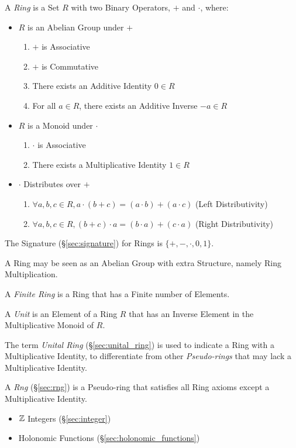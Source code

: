 \begin{itemize}
A \emph{Ring} is a Set $R$ with two Binary Operators, $+$ and
$\cdot$, where:
\begin{itemize}
\item $R$ is an Abelian Group under $+$
    \begin{enumerate}
        \item $+$ is Associative
        \item $+$ is Commutative
        \item There exists an Additive Identity $0 \in R$
        \item For all $a \in R$, there exists an Additive Inverse $-a
          \in R$
    \end{enumerate}
\item $R$ is a Monoid under $\cdot$
    \begin{enumerate}
        \item $\cdot$ is Associative
        \item There exists a Multiplicative Identity $1 \in R$
    \end{enumerate}
\item $\cdot$ Distributes over $+$
    \begin{enumerate}
        \item $\forall a,b,c \in R,
            a \cdot (b + c) = (a \cdot b) + (a \cdot c)$
            (Left Distributivity)
        \item $\forall a,b,c \in R,
            (b + c) \cdot a = (b \cdot a) + (c \cdot a)$
            (Right Distributivity)
    \end{enumerate}
\end{itemize}
The Signature (\S\ref{sec:signature}) for Rings is $\{+, -, \cdot, 0, 1\}$.

A Ring may be seen as an Abelian Group with extra Structure, namely Ring
Multiplication.

A \emph{Finite Ring} is a Ring that has a Finite number of Elements.

A \emph{Unit} is an Element of a Ring $R$ that has an Inverse
Element in the Multiplicative Monoid of $R$.

The term \emph{Unital Ring} (\S\ref{sec:unital_ring}) is used to
indicate a Ring with a Multiplicative Identity, to differentiate from
other \emph{Pseudo-rings} that may lack a Multiplicative Identity.

A \emph{Rng} (\S\ref{sec:rng}) is a Pseudo-ring that satisfies all
Ring axioms except a Multiplicative Identity.

\begin{itemize}
  \item $\mathbb{Z}$ Integers (\S\ref{sec:integer})
  \item Holonomic Functions (\S\ref{sec:holonomic_functions})
\end{itemize}


\end{itemize}
